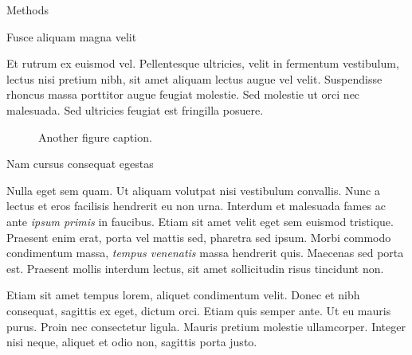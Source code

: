 \documentclass[final]{beamer}
\newlength{\colwidth}
\begin{document}
\begin{frame}[t]
\begin{columns}[t]
\begin{column}{\colwidth}
\begin{block}{Methods}
  \end{block}

  \begin{block}{Fusce aliquam magna velit}

    Et rutrum ex euismod vel. Pellentesque ultricies, velit in fermentum
    vestibulum, lectus nisi pretium nibh, sit amet aliquam lectus augue vel
    velit. Suspendisse rhoncus massa porttitor augue feugiat molestie. Sed
    molestie ut orci nec malesuada. Sed ultricies feugiat est fringilla
    posuere.

    \begin{figure}
      \centering
      \caption{Another figure caption.}
    \end{figure}

  \end{block}

  \begin{block}{Nam cursus consequat egestas}

    Nulla eget sem quam. Ut aliquam volutpat nisi vestibulum convallis. Nunc a
    lectus et eros facilisis hendrerit eu non urna. Interdum et malesuada fames
    ac ante \textit{ipsum primis} in faucibus. Etiam sit amet velit eget sem
    euismod tristique. Praesent enim erat, porta vel mattis sed, pharetra sed
    ipsum. Morbi commodo condimentum massa, \textit{tempus venenatis} massa
    hendrerit quis. Maecenas sed porta est. Praesent mollis interdum lectus,
    sit amet sollicitudin risus tincidunt non.

    Etiam sit amet tempus lorem, aliquet condimentum velit. Donec et nibh
    consequat, sagittis ex eget, dictum orci. Etiam quis semper ante. Ut eu
    mauris purus. Proin nec consectetur ligula. Mauris pretium molestie
    ullamcorper. Integer nisi neque, aliquet et odio non, sagittis porta justo.


\end{block}
\end{column}
\end{columns}
\end{frame}
\end{document}
